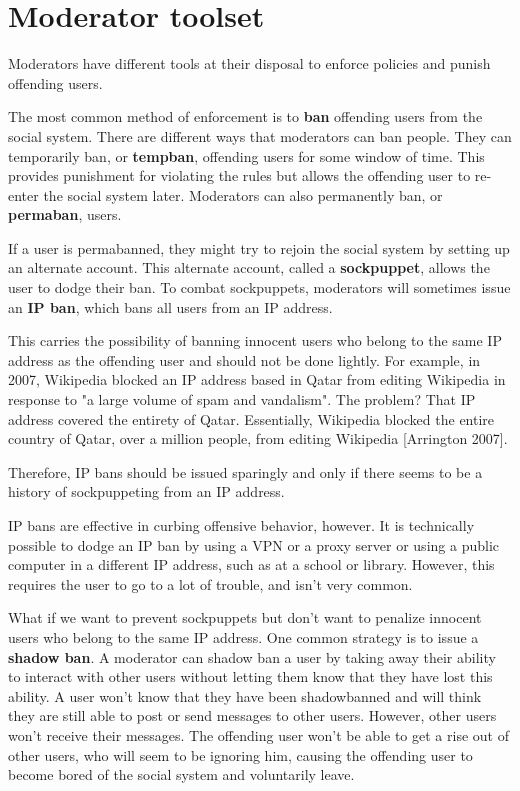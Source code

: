 \documentclass[class=book, crop=false]{standalone}
\providecommand{\keyterm}[1]{\textbf{#1}\marginnote{\scriptsize \textbf{#1}}}
\begin{document}
\section{Moderator toolset}

Moderators have different tools at their disposal to enforce policies and punish offending users.

The most common method of enforcement is to \keyterm{ban} offending users from the social system. There are different ways that moderators can ban people. They can temporarily ban, or \keyterm{tempban}, offending users for some window of time. This provides punishment for violating the rules but allows the offending user to re-enter the social system later. Moderators can also permanently ban, or \keyterm{permaban}, users.

If a user is permabanned, they might try to rejoin the social system by setting up an alternate account. This alternate account, called a \keyterm{sockpuppet}, allows the user to dodge their ban. To combat sockpuppets, moderators will sometimes issue an \keyterm{IP ban}, which bans all users from an IP address.

This carries the possibility of banning innocent users who belong to the same IP address as the offending user and should not be done lightly. For example, in 2007, Wikipedia blocked an IP address based in Qatar from editing Wikipedia in response to "a large volume of spam and vandalism". The problem? That IP address covered the entirety of Qatar. Essentially, Wikipedia blocked the entire country of Qatar, over a million people, from editing Wikipedia [Arrington 2007].

Therefore, IP bans should be issued sparingly and only if there seems to be a history of sockpuppeting from an IP address.

IP bans are effective in curbing offensive behavior, however. It is technically possible to dodge an IP ban by using a VPN or a proxy server or using a public computer in a different IP address, such as at a school or library. However, this requires the user to go to a lot of trouble, and isn't very common.

What if we want to prevent sockpuppets but don't want to penalize innocent users who belong to the same IP address. One common strategy is to issue a \keyterm{shadow ban}. A moderator can shadow ban a user by taking away their ability to interact with other users without letting them know that they have lost this ability. A user won't know that they have been shadowbanned and will think they are still able to post or send messages to other users. However, other users won't receive their messages. The offending user won't be able to get a rise out of other users, who will seem to be ignoring him, causing the offending user to become bored of the social system and voluntarily leave.
\end{document}
